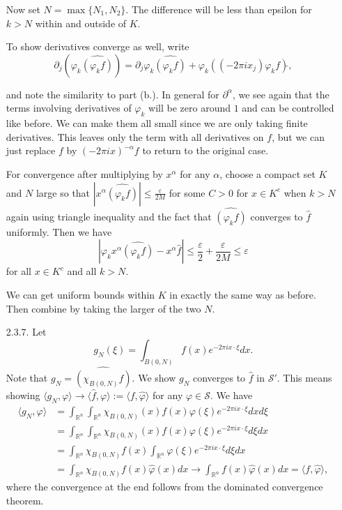 \documentclass[11pt, reqno]{article}
\theoremstyle{plain}
\theoremstyle{definition}
\theoremstyle{remark}
\renewcommand{\phi}{\varphi}
\renewcommand{\epsilon}{\varepsilon}
\newcommand{\RR}{\mathbb{R}}
\begin{document}
\begin{enumerate}
    Now set $N = \max \{N_1, N_2\}$. The difference will be less than epsilon for $k > N$ within and outside of $K$. 

    To show derivatives converge as well, write
    \[
        \partial_j(\phi_k \widehat{(\phi_k f)}) = \partial_j \phi_k \widehat{(\phi_k f)} + \phi_k ((-2\pi ix_j)\phi_k f)\widehat{},
    \]
    
    and note the similarity to part (b.). In general for $\partial^\alpha$, we see again that the terms involving derivatives of $\phi_k$ will
    be zero around $1$ and can be controlled like before. We can make them all small since we are only taking finite derivatives. 
    This leaves only the term with all derivatives on $f$, but we can just replace $f$ by $(-2\pi ix)^{-\alpha}f$ to return to 
    the original case. 

    For convergence after multiplying by $x^\alpha$ for any $\alpha$, choose a compact set $K$ and $N$ large so that $|x^\alpha\widehat{(\phi_k f)}| \leq \frac{\epsilon}{2M}$
    for some $C > 0$ for $x \in K^c$ when $k > N$ again using triangle inequality and the fact that $\widehat{(\phi_k f)}$ converges to $\widehat{f}$ uniformly. 
    Then we have
    \[
        |\phi_k x^\alpha \widehat{(\phi_k f)} - x^\alpha \widehat{f}| \leq \frac{\epsilon}{2} + \frac{\epsilon}{2M} \leq \epsilon
    \]
    for all $x \in K^c$ and all $k > N$. 

    We can get uniform bounds within $K$ in exactly the same way as before. Then combine by taking the larger of the two $N$. 

    \item[2.3.7.] Let 
    \[
        g_N(\xi) = \int_{B(0,N)}f(x)e^{-2\pi ix\cdot\xi}dx.
    \]
    Note that $g_N = \widehat{(\chi_{B(0,N)}f)}$. We show $g_N$ converges to $\widehat{f}$ in $\mathscr{S}'$. 
    This means showing $\langle g_N, \phi\rangle \to \langle \widehat{f}, \phi\rangle := \langle f, \widehat{\phi}\rangle$ for any $\phi \in \mathscr{S}$.
    We have
    \begin{align*}
        \langle g_N, \phi\rangle &= \int_{\RR^n}\int_{\RR^n}\chi_{B(0,N)}(x)f(x)\phi(\xi)e^{-2\pi i x\cdot\xi}dxd\xi\\
        &= \int_{\RR^n}\int_{\RR^n}\chi_{B(0,N)}(x)f(x)\phi(\xi)e^{-2\pi i x\cdot\xi}d\xi dx\\
        &= \int_{\RR^n}\chi_{B(0,N)}f(x)\int_{\RR^n}\phi(\xi)e^{-2\pi i x\cdot\xi}d\xi dx\\
        &= \int_{\RR^n}\chi_{B(0,N)}f(x)\widehat{\phi}(x)dx \to \int_{\RR^n}f(x)\widehat{\phi}(x)dx = \langle f, \widehat{\phi}\rangle,
    \end{align*}
    where the convergence at the end follows from the dominated convergence theorem.


\end{enumerate}
\end{document}
